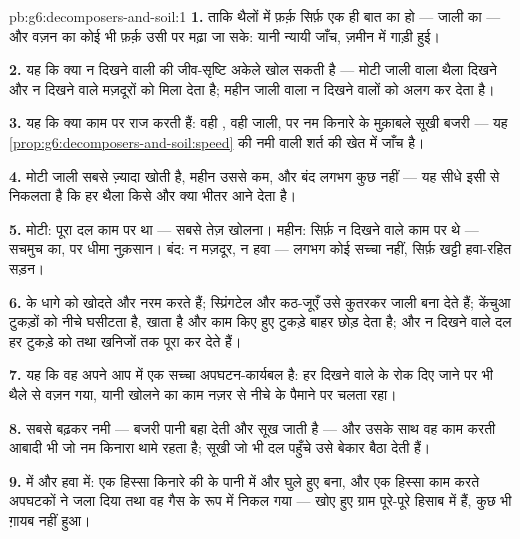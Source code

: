 \begin{solution}{pb:g6:decomposers-and-soil:1}
\textbf{1.} ताकि थैलों में फ़र्क़ सिर्फ़ एक ही बात का हो --- जाली का
--- और वज़न का कोई भी फ़र्क़ उसी पर मढ़ा जा सके: यानी न्यायी जाँच,
ज़मीन में गाड़ी हुई।

\textbf{2.} यह कि क्या न दिखने वाली  की जीव-सृष्टि अकेले 
खोल सकती है --- मोटी जाली वाला थैला दिखने और न दिखने वाले मज़दूरों को
मिला देता है; महीन जाली वाला न दिखने वालों को अलग कर देता है।

\textbf{3.} यह कि क्या  काम पर राज करती हैं: वही ,
वही जाली, पर नम किनारे के मुक़ाबले सूखी बजरी --- यह
\cref{prop:g6:decomposers-and-soil:speed} की नमी वाली शर्त की खेत में
जाँच है।

\textbf{4.} मोटी जाली सबसे ज़्यादा खोती है, महीन उससे कम, और बंद लगभग
कुछ नहीं --- यह सीधे इसी से निकलता है कि हर थैला किसे और क्या भीतर आने
देता है।

\textbf{5.} मोटी: पूरा दल काम पर था --- सबसे तेज़ खोलना। महीन: सिर्फ़ न
दिखने वाले काम पर थे --- सचमुच का, पर धीमा नुक़सान। बंद: न मज़दूर, न
हवा --- लगभग कोई सच्चा  नहीं, सिर्फ़ खट्टी हवा-रहित सड़न।

\textbf{6.}  के धागे  को खोदते और नरम करते हैं; स्प्रिंगटेल और
कठ-जूएँ उसे कुतरकर जाली बना देते हैं; केंचुआ टुकड़ों को नीचे घसीटता है,
खाता है और काम किए हुए टुकड़े बाहर छोड़ देता है; और न दिखने वाले दल हर
टुकड़े को  तथा खनिजों तक पूरा कर देते हैं।

\textbf{7.} यह कि वह अपने आप में एक सच्चा अपघटन-कार्यबल है: हर दिखने
वाले  के रोक दिए जाने पर भी थैले से वज़न गया, यानी खोलने का काम
नज़र से नीचे के पैमाने पर चलता रहा।

\textbf{8.} सबसे बढ़कर नमी --- बजरी पानी बहा देती और सूख जाती है ---
और उसके साथ वह काम करती आबादी भी जो नम किनारा थामे रहता है; सूखी
 जो भी दल पहुँचे उसे बेकार बैठा देती हैं।

\textbf{9.}  में और हवा में: एक हिस्सा किनारे की  के पानी
में  और घुले हुए  बना, और एक हिस्सा काम करते अपघटकों ने
जला दिया तथा वह गैस के रूप में निकल गया --- खोए हुए ग्राम पूरे-पूरे
हिसाब में हैं, कुछ भी ग़ायब नहीं हुआ।


\end{solution}
